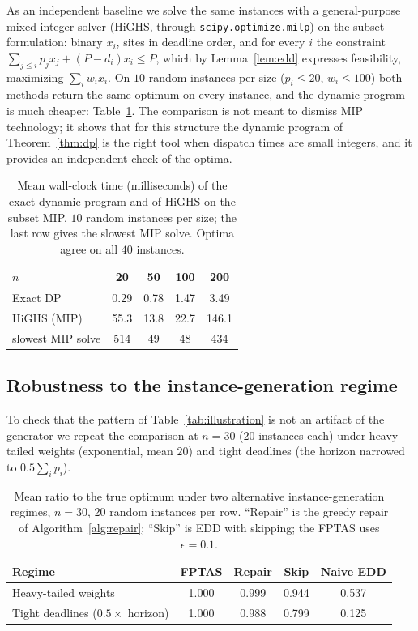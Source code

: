\documentclass[pdflatex,sn-mathphys-ay]{sn-jnl}
\theoremstyle{thmstyleone}
\theoremstyle{thmstyletwo}
\theoremstyle{thmstylethree}
\begin{document}
As an independent baseline we solve the same instances with a
general-purpose mixed-integer solver (HiGHS, through
\texttt{scipy.optimize.milp}) on the subset formulation: binary $x_i$,
sites in deadline order, and for every $i$ the constraint
$\sum_{j\le i}p_jx_j+(P-d_i)x_i\le P$, which by Lemma~\ref{lem:edd}
expresses feasibility, maximizing $\sum_iw_ix_i$. On $10$ random
instances per size ($p_i\le20$, $w_i\le100$) both methods return the same
optimum on every instance, and the dynamic program is much cheaper:
Table~\ref{tab:mip}. The comparison is not meant to dismiss MIP
technology; it shows that for this structure the dynamic program of
Theorem~\ref{thm:dp} is the right tool when dispatch times are small
integers, and it provides an independent check of the optima.

\begin{table}[h]
\caption{Mean wall-clock time (milliseconds) of the exact dynamic program
and of HiGHS on the subset MIP, $10$ random instances per size; the last
row gives the slowest MIP solve. Optima agree on all $40$
instances.}\label{tab:mip}
\begin{tabular}{@{}lcccc@{}}
\toprule
$n$ & 20 & 50 & 100 & 200 \\
\midrule
Exact DP & 0.29 & 0.78 & 1.47 & 3.49 \\
HiGHS (MIP) & 55.3 & 13.8 & 22.7 & 146.1 \\
slowest MIP solve & 514 & 49 & 48 & 434 \\
\bottomrule
\end{tabular}
\end{table}

\subsection{Robustness to the instance-generation regime}\label{sec:robust}

To check that the pattern of Table~\ref{tab:illustration} is not an
artifact of the generator we repeat the comparison at $n=30$ ($20$
instances each) under heavy-tailed weights (exponential, mean $20$) and
tight deadlines (the horizon narrowed to $0.5\sum_ip_i$).

\begin{table}[h]
\caption{Mean ratio to the true optimum under two alternative
instance-generation regimes, $n=30$, 20 random instances per row.
``Repair'' is the greedy repair of Algorithm~\ref{alg:repair}; ``Skip'' is
EDD with skipping; the FPTAS uses $\epsilon=0.1$.}\label{tab:robustness}
\begin{tabular}{@{}lcccc@{}}
\toprule
Regime & FPTAS & Repair & Skip & Naive EDD \\
\midrule
Heavy-tailed weights & 1.000 & 0.999 & 0.944 & 0.537 \\
Tight deadlines ($0.5\times$ horizon) & 1.000 & 0.988 & 0.799 & 0.125 \\
\bottomrule
\end{tabular}
\end{table}
\end{document}
